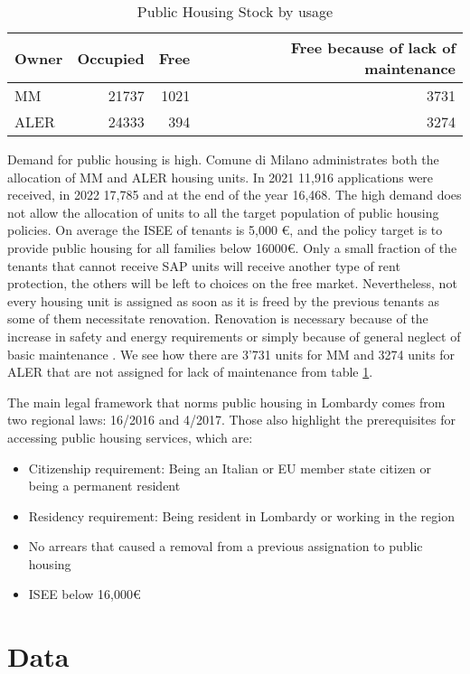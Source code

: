 \documentclass[12pt]{article}
\begin{document}
\begin{table}
	\centering
	\begin{tabular}{lrrr}
		\toprule
		Owner & Occupied & Free & Free because of lack of maintenance\\
		\midrule
		MM & 21737&1021&3731\\
		ALER& 24333&394&3274\\
		\bottomrule
	\end{tabular}
	\caption{Public Housing Stock by usage}
	\label{occup}
\end{table}

Demand for public housing is high. Comune di Milano administrates both the allocation of MM and ALER housing units. In 2021 11,916 applications were received, in 2022 17,785 and at the end of the year 16,468. The high demand does not allow the allocation of units to all the target population of public housing policies. On average the ISEE of tenants is 5,000 €, and the policy target is to provide public housing for all families below 16000€. Only a small fraction of the tenants that cannot receive SAP units will receive another type of rent protection, the others will be left to choices on the free market. Nevertheless, not every housing unit is assigned as soon as it is freed by the previous tenants as some of them necessitate renovation. Renovation is necessary because of the increase in safety and energy requirements or simply because of general neglect of basic maintenance \parencite{comune2023}. We see how there are 3'731 units for MM and 3274 units for ALER that are not assigned for lack of maintenance from table \ref{occup}.


 The main legal framework that norms public housing in Lombardy comes from two regional laws: 16/2016 and 4/2017. Those also highlight the prerequisites for accessing public housing services, which are:
\begin{itemize}
	\item Citizenship requirement: Being an Italian or EU member state citizen or being a permanent resident
	\item Residency requirement: Being resident in Lombardy or working in the region
	\item No arrears that caused a removal from a previous assignation to public housing 
	\item ISEE below 16,000€
\end{itemize} 
\parencite{Incorvaia}



\section{Data}\label{data}
\end{document}
